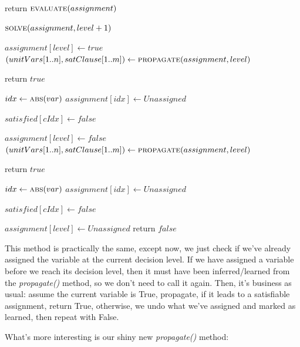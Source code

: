 \begin{algorithm}[H]
\caption{Recursive Solving}\label{alg:13}
\begin{algorithmic}[1]


    \State return $\Call{evaluate}{assignment}$
\EndIf

    \State $\Call{solve}{assignment, level + 1}$
\EndIf

\State $assignment[level] \gets true$
\State $(unitVars[1..n], satClause[1..m]) \gets \Call{propagate}{assignment, level}$

    \State return $true$
\EndIf

    \State $idx \gets \Call{abs}{var}$
    \State $assignment[idx] \gets Unassigned$
\EndFor

    \State $satisfied[cIdx] \gets false$
\EndFor

\State $assignment[level] \gets false$
\State $(unitVars[1..n], satClause[1..m]) \gets \Call{propagate}{assignment, level}$

    \State return $true$
\EndIf

    \State $idx \gets \Call{abs}{var}$
    \State $assignment[idx] \gets Unassigned$
\EndFor

    \State $satisfied[cIdx] \gets false$
\EndFor

\State $assignment[level] \gets Unassigned$
\State return $false$

\EndProcedure
\end{algorithmic}
\end{algorithm}

This method is practically the same, except now, we just check if we've already assigned 
the variable at the current decision level. If we have assigned a variable before we reach 
its decision level, then it must have been inferred/learned from the \textit{propagate()} 
method, so we don't need to call it again. Then, it's business as usual: assume the 
current variable is True, propagate, if it leads to a satisfiable assignment, return True, 
otherwise, we undo what we've assigned and marked as learned, then repeat with False. 

What's more interesting is our shiny new \textit{propagate()} method:

